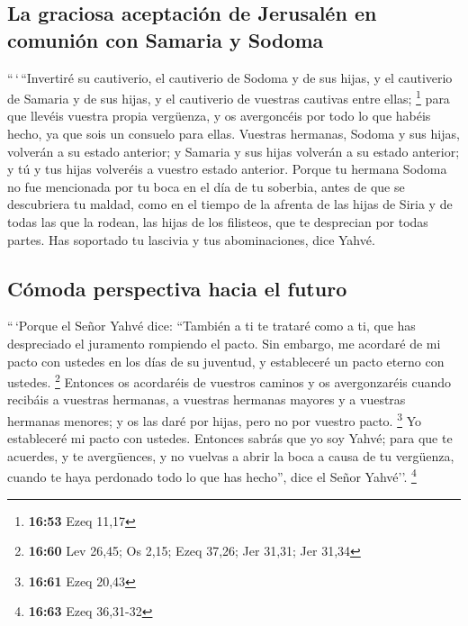 \hypertarget{la-graciosa-aceptaciuxf3n-de-jerusaluxe9n-en-comuniuxf3n-con-samaria-y-sodoma}{%
\subsection{La graciosa aceptación de Jerusalén en comunión con Samaria
y
Sodoma}\label{la-graciosa-aceptaciuxf3n-de-jerusaluxe9n-en-comuniuxf3n-con-samaria-y-sodoma}}

 ``\,`\,``Invertiré su cautiverio, el cautiverio de
Sodoma y de sus hijas, y el cautiverio de Samaria y de sus hijas, y el
cautiverio de vuestras cautivas entre ellas; \footnote{\textbf{16:53}
  Ezeq 11,17}  para que llevéis vuestra propia vergüenza,
y os avergoncéis por todo lo que habéis hecho, ya que sois un consuelo
para ellas.  Vuestras hermanas, Sodoma y sus hijas,
volverán a su estado anterior; y Samaria y sus hijas volverán a su
estado anterior; y tú y tus hijas volveréis a vuestro estado anterior.
 Porque tu hermana Sodoma no fue mencionada por tu boca
en el día de tu soberbia,  antes de que se descubriera tu
maldad, como en el tiempo de la afrenta de las hijas de Siria y de todas
las que la rodean, las hijas de los filisteos, que te desprecian por
todas partes.  Has soportado tu lascivia y tus
abominaciones, dice Yahvé.

\hypertarget{cuxf3moda-perspectiva-hacia-el-futuro}{%
\subsection{Cómoda perspectiva hacia el
futuro}\label{cuxf3moda-perspectiva-hacia-el-futuro}}

 ``\,`Porque el Señor Yahvé dice: ``También a ti te
trataré como a ti, que has despreciado el juramento rompiendo el pacto.
 Sin embargo, me acordaré de mi pacto con ustedes en los
días de su juventud, y estableceré un pacto eterno con ustedes.
\footnote{\textbf{16:60} Lev 26,45; Os 2,15; Ezeq 37,26; Jer 31,31; Jer
  31,34}  Entonces os acordaréis de vuestros caminos y os
avergonzaréis cuando recibáis a vuestras hermanas, a vuestras hermanas
mayores y a vuestras hermanas menores; y os las daré por hijas, pero no
por vuestro pacto. \footnote{\textbf{16:61} Ezeq 20,43} 
Yo estableceré mi pacto con ustedes. Entonces sabrás que yo soy Yahvé;
 para que te acuerdes, y te avergüences, y no vuelvas a
abrir la boca a causa de tu vergüenza, cuando te haya perdonado todo lo
que has hecho'', dice el Señor Yahvé''. \footnote{\textbf{16:63} Ezeq
  36,31-32}

